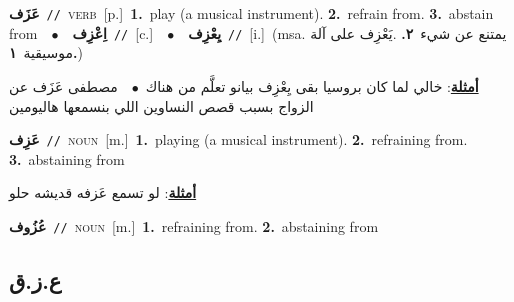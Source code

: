 \documentclass[10pt,a4paper,twoside]{article} %
\begin{document}
\begin{multicols}{2}
{\setlength\topsep{0pt}\textbf{\foreignlanguage{arabic}{عَزَف}}\ {\color{gray}\texttt{//}\color{black}}\ \textsc{verb}\ [p.]\ \textbf{1.}~play (a musical instrument).  \textbf{2.}~refrain from.  \textbf{3.}~abstain from\ \ $\bullet$\ \ \setlength\topsep{0pt}\textbf{\foreignlanguage{arabic}{اِعْزِف}}\ {\color{gray}\texttt{//}\color{black}}\ [c.]\ \ $\bullet$\ \ \setlength\topsep{0pt}\textbf{\foreignlanguage{arabic}{يِعْزِف}}\ {\color{gray}\texttt{//}\color{black}}\ [i.]\ \color{gray}(msa. \foreignlanguage{arabic}{يمتنع عن شيء}~\foreignlanguage{arabic}{\textbf{٢.}}  .\foreignlanguage{arabic}{يَعْزِف على آلة موسيقية}~\foreignlanguage{arabic}{\textbf{١.}})\color{black}\  \begin{flushright}\color{gray}\foreignlanguage{arabic}{\textbf{\underline{\foreignlanguage{arabic}{أمثلة}}}: خالي لما كان بروسيا بقى يِعْزِف بيانو تعلَّم من هناك\ $\bullet$\ \  مصطفى عَزَف عن الزواج بسبب قصص النساوين اللي بنسمعها هاليومين}\end{flushright}\color{black}} \vspace{2mm}

{\setlength\topsep{0pt}\textbf{\foreignlanguage{arabic}{عَزِف}}\ {\color{gray}\texttt{//}\color{black}}\ \textsc{noun}\ [m.]\ \textbf{1.}~playing (a musical instrument).  \textbf{2.}~refraining from.  \textbf{3.}~abstaining from\  \begin{flushright}\color{gray}\foreignlanguage{arabic}{\textbf{\underline{\foreignlanguage{arabic}{أمثلة}}}: لو تسمع عَزفه قديشه حلو}\end{flushright}\color{black}} \vspace{2mm}

{\setlength\topsep{0pt}\textbf{\foreignlanguage{arabic}{عُزُوف}}\ {\color{gray}\texttt{//}\color{black}}\ \textsc{noun}\ [m.]\ \textbf{1.}~refraining from.  \textbf{2.}~abstaining from\ } \vspace{2mm}

\vspace{-3mm}
\subsection*{\color{blue}\foreignlanguage{arabic}{ع.ز.ق}\color{blue}{}} 


\end{multicols}
\end{document}
